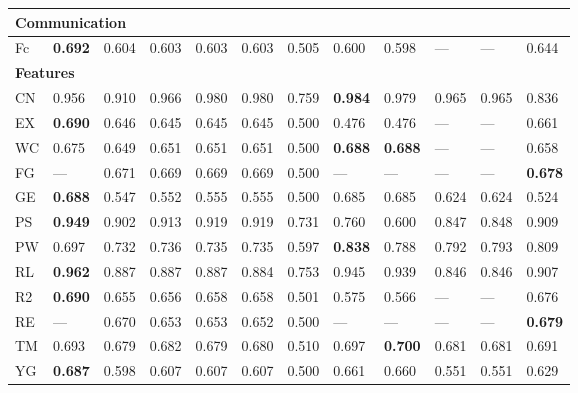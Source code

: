 \begin{longtable}{ llllllllllll }
\hline
\multicolumn{12}{|l|}{\textbf{Communication}} \\
\hline
\textsf{Fc}                   & \bf{0.692} & 0.604 & 0.603 & 0.603 & 0.603 & 0.505 & 0.600 & 0.598 & --- & --- & 0.644 \\

\hline
\multicolumn{12}{|l|}{\textbf{Features}} \\
\hline
\textsf{CN}                   & 0.956 & 0.910 & 0.966 & 0.980 & 0.980 & 0.759 & \bf{0.984} & 0.979 & 0.965 & 0.965 & 0.836 \\
\textsf{EX}                   & \bf{0.690} & 0.646 & 0.645 & 0.645 & 0.645 & 0.500 & 0.476 & 0.476 & --- & --- & 0.661 \\
\textsf{WC}                   & 0.675 & 0.649 & 0.651 & 0.651 & 0.651 & 0.500 & \bf{0.688} & \bf{0.688} & --- & --- & 0.658 \\
\textsf{FG}                   & --- & 0.671 & 0.669 & 0.669 & 0.669 & 0.500 & --- & --- & --- & --- & \bf{0.678} \\
\textsf{GE}                   & \bf{0.688} & 0.547 & 0.552 & 0.555 & 0.555 & 0.500 & 0.685 & 0.685 & 0.624 & 0.624 & 0.524 \\
\textsf{PS}                   & \bf{0.949} & 0.902 & 0.913 & 0.919 & 0.919 & 0.731 & 0.760 & 0.600 & 0.847 & 0.848 & 0.909 \\
\textsf{PW}                   & 0.697 & 0.732 & 0.736 & 0.735 & 0.735 & 0.597 & \bf{0.838} & 0.788 & 0.792 & 0.793 & 0.809 \\
\textsf{RL}                   & \bf{0.962} & 0.887 & 0.887 & 0.887 & 0.884 & 0.753 & 0.945 & 0.939 & 0.846 & 0.846 & 0.907 \\
\textsf{R2}                   & \bf{0.690} & 0.655 & 0.656 & 0.658 & 0.658 & 0.501 & 0.575 & 0.566 & --- & --- & 0.676 \\
\textsf{RE}                   & --- & 0.670 & 0.653 & 0.653 & 0.652 & 0.500 & --- & --- & --- & --- & \bf{0.679} \\
\textsf{TM}                   & 0.693 & 0.679 & 0.682 & 0.679 & 0.680 & 0.510 & 0.697 & \bf{0.700} & 0.681 & 0.681 & 0.691 \\
\textsf{YG}                   & \bf{0.687} & 0.598 & 0.607 & 0.607 & 0.607 & 0.500 & 0.661 & 0.660 & 0.551 & 0.551 & 0.629 \\


\end{longtable}
